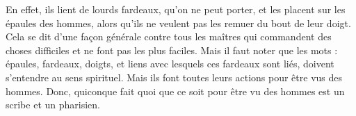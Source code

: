 En effet, ils lient de lourds fardeaux, qu'on ne peut porter, et les placent sur les épaules des hommes, alors qu'ils ne veulent pas les remuer du bout de leur doigt. Cela se dit d’une façon générale contre tous les maîtres qui commandent des choses difficiles et ne font pas les plus faciles. Mais il faut noter que les mots : épaules, fardeaux, doigts, et liens avec lesquels ces fardeaux sont liés, doivent s’entendre au sens spirituel. Mais ils font toutes leurs actions pour être vus des hommes. Donc, quiconque fait quoi que ce soit pour être vu des hommes est un scribe et un pharisien.
